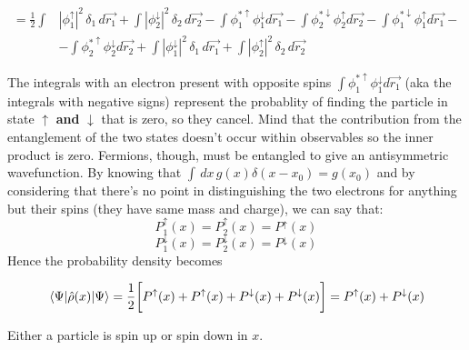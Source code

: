 	\begin{align*}
		=\frac{1}{2}\int&|\phi_1^\uparrow|^2 \,\delta_1\, d\vec{r_1}+\int |\phi_2^\downarrow|^2\, \delta_2\, d\vec{r_2}-\int \phi_1^{*\uparrow}\phi_1^\downarrow d\vec{r_1}-\int \phi_2^{*\downarrow}\phi_2^\uparrow d\vec{r_2}-\int \phi_1^{*\downarrow}\phi_1^\uparrow d\vec{r_1}-\\
										&-\int \phi_2^{*\uparrow}\phi_2^\downarrow d\vec{r_2}+\int |\phi_1^\downarrow|^2\, \delta_1\, d\vec{r_1}+\int |\phi_2^\uparrow|^2\, \delta_2\, d\vec{r_2}
	\end{align*}

	The integrals with an electron present with opposite spins $\int \phi_1^{*\uparrow}\phi_1^\downarrow d\vec{r_1}$ (aka the integrals with negative signs) represent the probablity of finding the particle in state $\uparrow$ \textbf{and} $\downarrow$ that is zero, so they cancel.
Mind that the contribution from the entanglement of the two states doesn't occur within observables so the inner product is zero.
Fermions, though, must be entangled to give an antisymmetric wavefunction.
	By knowing that $\int\,dx\, g(x)\delta(x-x_0)=g(x_0)$ and by considering that there's no point in distinguishing the two electrons for anything but their spins (they have same mass and charge), we can say that:
	\[P_1^\uparrow(x)=P_2^\uparrow(x)=P^\uparrow(x)\]
	\[P_1^\downarrow(x)=P_2^\downarrow(x)=P^\downarrow(x)\]
	Hence the probability density becomes

	$$\mel{\Psi}{\hat{\rho}(x)}{\Psi}=\frac{1}{2}\bigg[P^\uparrow(x)+P^\uparrow(x)+P^\downarrow(x)+P^\downarrow(x)\bigg]=P^\uparrow(x)+P^\downarrow(x)$$

	Either a particle is spin up or spin down in $x$.
